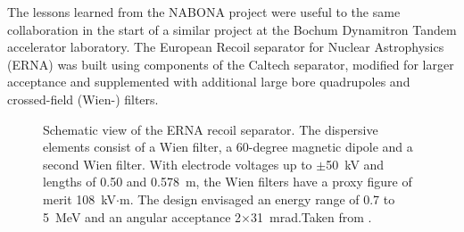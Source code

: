 The lessons learned from the NABONA project were useful to the same collaboration in the start of a similar project at the Bochum Dynamitron Tandem accelerator laboratory. The European Recoil separator for Nuclear Astrophysics (ERNA) was built using components of the Caltech separator, modified for larger acceptance and supplemented with additional large bore quadrupoles and crossed-field (Wien-) filters.
\begin{figure}
\begin{center}
\caption{Schematic view of the ERNA recoil separator. The dispersive elements consist of a Wien filter, a 60-degree magnetic dipole and a second Wien filter.    With electrode voltages up to $\pm$50~kV and lengths of 0.50 and 0.578~m, the Wien filters have a proxy figure of merit 108~kV$\cdot$m.   The design envisaged an energy range of 0.7 to 5~MeV and an angular acceptance 2$\times$31~mrad.Taken from \cite{dile08}.}
\label{fig:erna}       %
\end{center}
\end{figure}
